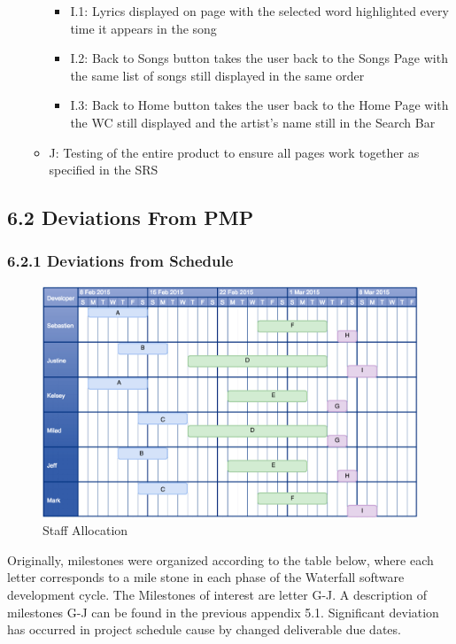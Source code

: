 \documentclass[]{article}
\begin{document}
\begin{itemize}
\begin{itemize}
    \begin{itemize}
    \itemsep1pt\parskip0pt
    \item
      I.1: Lyrics displayed on page with the selected word highlighted
      every time it appears in the song
    \item
      I.2: Back to Songs button takes the user back to the Songs Page
      with the same list of songs still displayed in the same order
    \item
      I.3: Back to Home button takes the user back to the Home Page with
      the WC still displayed and the artist's name still in the Search
      Bar
    \end{itemize}
  \item
    J: Testing of the entire product to ensure all pages work together
    as specified in the SRS
  \end{itemize}
\end{itemize}

\subsection{6.2 Deviations From PMP}\label{deviations-from-pmp}

\subsubsection{6.2.1 Deviations from
Schedule}\label{deviations-from-schedule}


\begin{figure}[htbp]
\centering
\includegraphics{StaffAllocation.png}
\caption{Staff Allocation}
\end{figure}

Originally, milestones were organized according to the table below,
where each letter corresponds to a mile stone in each phase of the
Waterfall software development cycle. The Milestones of interest are
letter G-J. A description of milestones G-J can be found in the previous
appendix 5.1. Significant deviation has occurred in project schedule
cause by changed deliverable due dates.
\end{document}
